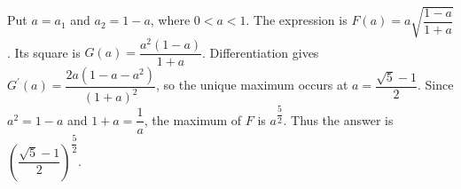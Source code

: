 Put $a=a_1$ and $a_2=1-a$, where $0<a<1$. The expression is $F(a)=a\sqrt{\dfrac{1-a}{1+a}}$. Its square is $G(a)=\dfrac{a^2(1-a)}{1+a}$. Differentiation gives $G^{\prime}(a)=\dfrac{2a(1-a-a^2)}{(1+a)^2}$, so the unique maximum occurs at $a=\dfrac{\sqrt5-1}{2}$. Since $a^2=1-a$ and $1 + a = \dfrac{1}{a}$, the maximum of $F$ is $a^{\dfrac{5}{2}}$. Thus the answer is $\boxed{\left (\dfrac{\sqrt5-1}{2}\right)^{\dfrac{5}{2}}}$.
